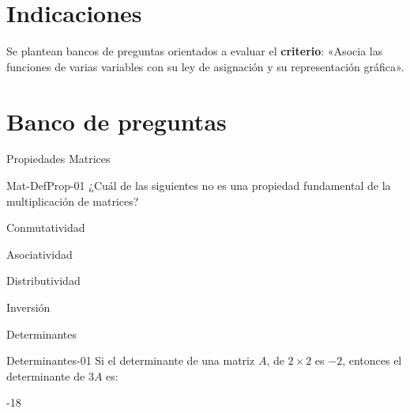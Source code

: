 \documentclass[a4,11pt]{aleph-notas}
\begin{document}
\encabezado

\vspace*{-8mm}
\tableofcontents

\section{Indicaciones}

Se plantean bancos de preguntas orientados a evaluar el \textbf{criterio}: «Asocia las funciones de varias variables con su ley de asignación y su representación gráfica».

\section{Banco de preguntas}


\begin{quiz}{Propiedades Matrices}

\begin{multi}[]%
    {Mat-DefProp-01}
    ¿Cuál de las siguientes no es una propiedad fundamental de la multiplicación de matrices?
    \item* Conmutatividad
    \item Asociatividad
    \item Distributividad
    \item Inversión
\end{multi}

\end{quiz}


\begin{quiz}{Determinantes}

\begin{numerical}[tolerance=0.01]%
    {Determinantes-01}
    Si el determinante de una matriz $A$, de $2\times 2$ es $-2$, entonces el determinante de $3A$ es:
    \item -18
\end{numerical}


\end{quiz}
\end{document}
